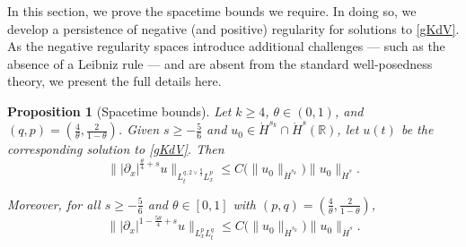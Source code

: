 \documentclass[10pt, reqno]{amsart}
\numberwithin{equation}{section}
\newcommand{\R}{\mathbb{R}}
\newtheorem{proposition}[theorem]{Proposition}
\theoremstyle{definition}
\theoremstyle{remark}
\begin{document}
    In this section, we prove the spacetime bounds we require. In doing so, we develop a persistence of negative (and positive) regularity for solutions to \eqref{gKdV}. As the negative regularity spaces introduce additional challenges --- such as the absence of a Leibniz rule --- and are absent from the standard well-posedness theory, we present the full details here.
    \begin{proposition}[Spacetime bounds]\label{spacetime/theorem}
        Let $k \geq 4$, $\theta \in (0,1)$, and $(q,p) = (\frac{4}{\theta},\frac{2}{1-\theta})$.
        Given $s \geq - \frac{5}{6}$ and $u_0 \in \dot{H}^{s_k} \cap \dot{H}^s(\R)$, let $u(t)$ be the corresponding solution to \eqref{gKdV}.
        Then
        \begin{equation}\label{spacetime/theorem 1}
            \big\||\partial_x|^{\frac{\theta}{4} + s} u\big\|_{L_t^{q,2 \vee \frac{q}{3}} L_x^{p}} \leq C\big(\|u_0\|_{\dot{H}^{s_k}}\big) \|u_0\|_{\dot{H}^s}.
        \end{equation}

        Moreover, for all $s \geq -\frac{5}{6}$ and $\theta \in [0,1]$ with $(p,q) = (\frac{4}{\theta}, \frac{2}{1-\theta})$,
        \begin{equation}\label{spacetime/theorem 2}
            \big\||\partial_x|^{1 - \frac{5\theta}{4} + s}u\big\|_{L_x^p L_t^q} \leq C\big(\|u_0\|_{\dot{H}^{s_k}}\big) \|u_0\|_{\dot{H}^s}.
        \end{equation}
    \end{proposition}
\end{document}
